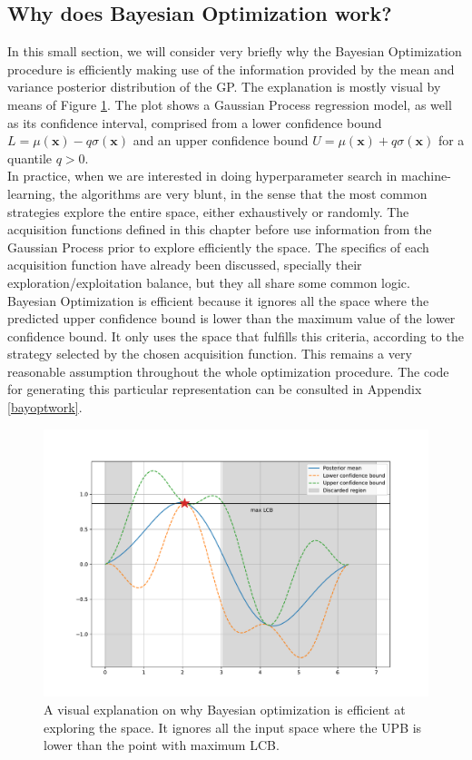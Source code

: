 \documentclass[10pt,a4paper,twoside]{book}
\begin{document}
\subsection{Why does Bayesian Optimization work?}

In this small section, we will consider very briefly why the Bayesian Optimization procedure is efficiently making use of the information provided by the mean and variance posterior distribution of the GP. The explanation is mostly visual by means of Figure \ref{fig:explanation}. The plot shows a Gaussian Process regression model, as well as its confidence interval, comprised from a lower confidence bound $L = \mu(\boldsymbol{x}) - q\sigma(\boldsymbol{x})$ and an upper confidence bound $U = \mu(\boldsymbol{x}) + q\sigma(\boldsymbol{x})$ for a quantile $q>0$.\\

In practice, when we are interested in doing hyperparameter search in machine-learning, the algorithms are very blunt, in the sense that the most common strategies explore the entire space, either exhaustively or randomly. The acquisition functions defined in this chapter before use information from the Gaussian Process prior to explore efficiently the space. The specifics of each acquisition function have already been discussed, specially their exploration/exploitation balance, but they all share some common logic.\\

Bayesian Optimization is efficient because it ignores all the space where the predicted upper confidence bound is lower than the maximum value of the lower confidence bound. It only uses the space that fulfills this criteria, according to the strategy selected by the chosen acquisition function. This remains a very reasonable assumption throughout the whole optimization procedure. The code for generating this particular representation can be consulted in Appendix \ref{bayoptwork}.

\begin{figure}
	\caption{A visual explanation on why Bayesian optimization is efficient at exploring the space. It ignores all the input space where the UPB is lower than the point with maximum LCB.}
	\label{fig:explanation}
	\includegraphics[width=\textwidth]{figures/chapter3/explanation}
\end{figure}
\end{document}
